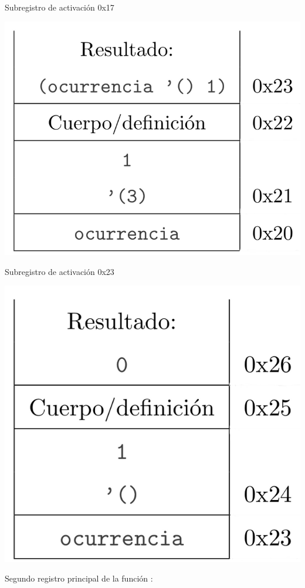 \begin{multicols}{2}
Subregistro de activación 0x17
\begin{center}
        \includegraphics[scale=0.3]{./R4}
\end{center}

Subregistro de activación 0x23
\begin{center}
        \includegraphics[scale=0.3]{./R5}
\end{center}
\end{multicols}

Segundo registro principal de la función :
